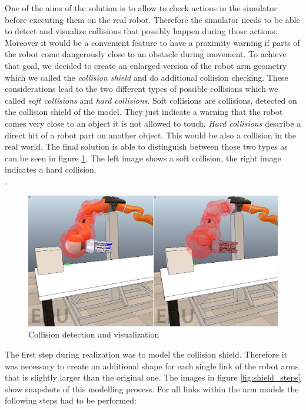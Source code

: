 One of the aims of the solution is to allow to check actions in the simulator before executing them on the real robot. Therefore the simulator needs to be able to detect and visualize collisions that possibly happen during those actions. Moreover it would be a convenient feature to have a proximity warning if parts of the robot come dangerously close to an obstacle during movement. To achieve that goal, we decided to create an enlarged version of the robot arm geometry which we called the \emph{collision shield} and do additional collision checking. These considerations lead to the two different types of possible collisions which we called \emph{soft collisions} and \emph{hard collisions}. Soft collisions are collisions, detected on the collision shield of the model. They just indicate a warning that the robot comes very close to an object it is not allowed to touch. \emph{Hard collisions} describe a direct hit of a robot part on another object. This would be also a collision in the real world. The final solution is able to distinguish between those two types as can be seen in figure \ref{fig:collision}. The left image shows a soft collision, the right image indicates a hard collision.\\. 

\begin{figure}[hb]
	\centering
  	\includegraphics[width=1.0\textwidth]{images/collision.jpg}
	\caption{Collision detection and visualization}
	\label{fig:collision}
\end{figure}

The first step during realization was to model the collision shield. Therefore it was necessary to create an additional shape for each single link of the robot arms that is slightly larger than the original one. The images in figure \ref{fig:shield_steps} show snapshots of this modelling process. For all links within the arm models the following steps had to be performed:

